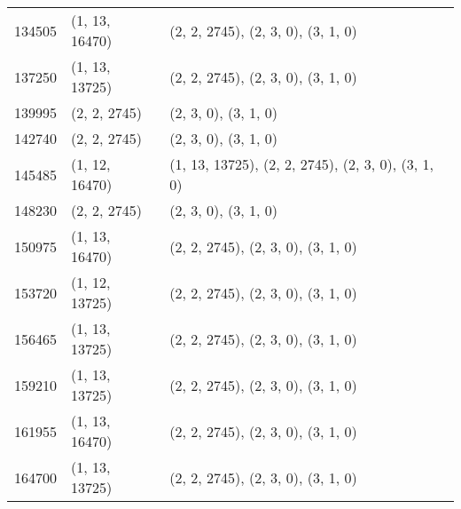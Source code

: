 \begin{center}
\begin{longtable}{|l|l|l|}
		134505 & (1, 13, 16470) & (2, 2, 2745), (2, 3, 0), (3, 1, 0) \\
		137250 & (1, 13, 13725) & (2, 2, 2745), (2, 3, 0), (3, 1, 0) \\
		139995 & (2, 2, 2745) & (2, 3, 0), (3, 1, 0) \\
		142740 & (2, 2, 2745) & (2, 3, 0), (3, 1, 0) \\
		145485 & (1, 12, 16470) & (1, 13, 13725), (2, 2, 2745), (2, 3, 0), (3, 1, 0) \\
		148230 & (2, 2, 2745) & (2, 3, 0), (3, 1, 0) \\
		150975 & (1, 13, 16470) & (2, 2, 2745), (2, 3, 0), (3, 1, 0) \\
		153720 & (1, 12, 13725) & (2, 2, 2745), (2, 3, 0), (3, 1, 0) \\
		156465 & (1, 13, 13725) & (2, 2, 2745), (2, 3, 0), (3, 1, 0) \\
		159210 & (1, 13, 13725) & (2, 2, 2745), (2, 3, 0), (3, 1, 0) \\
		161955 & (1, 13, 16470) & (2, 2, 2745), (2, 3, 0), (3, 1, 0) \\
		164700 & (1, 13, 13725) & (2, 2, 2745), (2, 3, 0), (3, 1, 0) \\
	\end{longtable}
\end{center}

\lipsum[3-4]